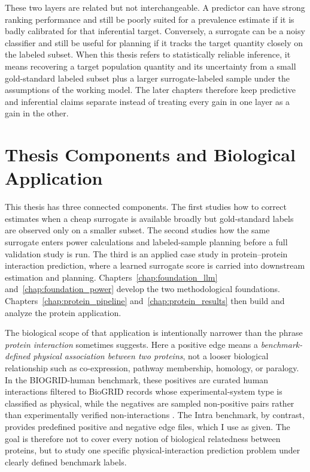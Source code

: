 These two layers are related but not interchangeable. A predictor can have strong ranking performance and still be poorly suited for a prevalence estimate if it is badly calibrated for that inferential target. Conversely, a surrogate can be a noisy classifier and still be useful for planning if it tracks the target quantity closely on the labeled subset. When this thesis refers to statistically reliable inference, it means recovering a target population quantity and its uncertainty from a small gold-standard labeled subset plus a larger surrogate-labeled sample under the assumptions of the working model. The later chapters therefore keep predictive and inferential claims separate instead of treating every gain in one layer as a gain in the other.

\section{Thesis Components and Biological Application}

This thesis has three connected components. The first studies how to correct estimates when a cheap surrogate is available broadly but gold-standard labels are observed only on a smaller subset. The second studies how the same surrogate enters power calculations and labeled-sample planning before a full validation study is run. The third is an applied case study in protein--protein interaction prediction, where a learned surrogate score is carried into downstream estimation and planning. Chapters~\ref{chap:foundation_llm} and~\ref{chap:foundation_power} develop the two methodological foundations. Chapters~\ref{chap:protein_pipeline} and~\ref{chap:protein_results} then build and analyze the protein application.

The biological scope of that application is intentionally narrower than the phrase \emph{protein interaction} sometimes suggests. Here a positive edge means a \emph{benchmark-defined physical association between two proteins}, not a looser biological relationship such as co-expression, pathway membership, homology, or paralogy. In the BIOGRID-human benchmark, these positives are curated human interactions filtered to BioGRID records whose experimental-system type is classified as physical, while the negatives are sampled non-positive pairs rather than experimentally verified non-interactions \parencite{vidal2011, biogrid2019, luck2020}. The Intra benchmark, by contrast, provides predefined positive and negative edge files, which I use as given. The goal is therefore not to cover every notion of biological relatedness between proteins, but to study one specific physical-interaction prediction problem under clearly defined benchmark labels.


